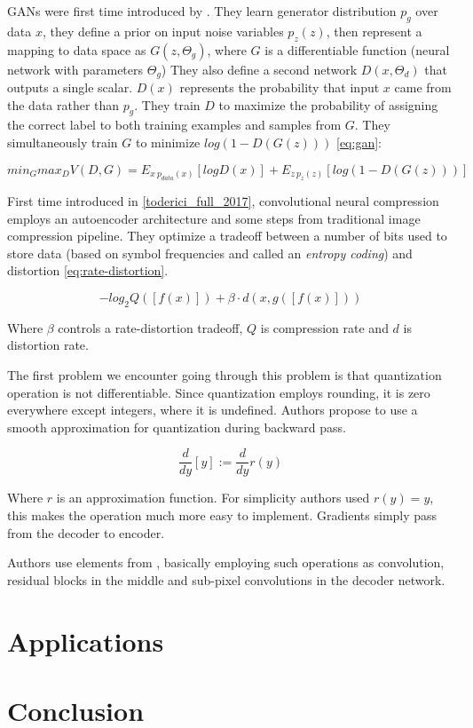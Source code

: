 GANs were first time introduced by \cite[Goodfellow et al]{Goodfellow_Pouget-Abadie_Mirza_Xu_Warde-Farley_Ozair_Courville_Bengio_2014}. They learn generator distribution $p_g$ over data $x$, they define a prior on input noise variables $p_z(z)$, then represent a mapping to data space as $G(z, \Theta_g)$, where $G$ is a differentiable function (neural network with parameters $\Theta_g$) They also define a second network $D(x, \Theta_d)$ that outputs a single scalar. $D(x)$ represents the probability that input $x$ came from the data rather than $p_g$. They train $D$ to maximize the probability of assigning the correct label to both training examples and samples from $G$. They simultaneously train $G$ to minimize $log(1 − D(G(z)))$ \ref{eq:gan}:

\begin{equation}
    \label{eq:gan}
    min_G max_D V(D, G) = E_{x~p_{data}(x)} [log D(x)] + E_{z~p_z(z)} [log(1 - D(G(z)))]
\end{equation}

First time introduced in \ref{toderici_full_2017}, convolutional neural compression employs an autoencoder architecture and some steps from traditional image compression pipeline. They optimize a tradeoff between a number of bits used to store data (based on symbol frequencies and called an \textit{entropy coding}) and distortion \ref{eq:rate-distortion}.

\begin{equation}
    \label{eq:rate-distortion}
    − log_2 Q ([f (x)]) + \beta · d (x, g([f (x)]))
\end{equation}

Where $\beta$ controls a rate-distortion tradeoff, $Q$ is compression rate and $d$ is distortion rate.

The first problem we encounter going through this problem is that quantization operation is not differentiable. Since quantization employs rounding, it is zero everywhere except integers, where it is undefined. Authors propose to use a smooth approximation for quantization during backward pass.

\begin{equation}
    \label{eq:quantization}
    \frac{d}{dy}[y]:=\frac{d}{dy}r(y)
\end{equation}

Where $r$ is an approximation function. For simplicity authors used $r(y)=y$, this makes the operation much more easy to implement. Gradients simply pass from the decoder to encoder.

Authors use elements from \cite{shi_real-time_2016}, basically employing such operations as convolution, residual blocks in the middle and sub-pixel convolutions in the decoder network.

\chapter{Applications}

\chapter{Conclusion}
